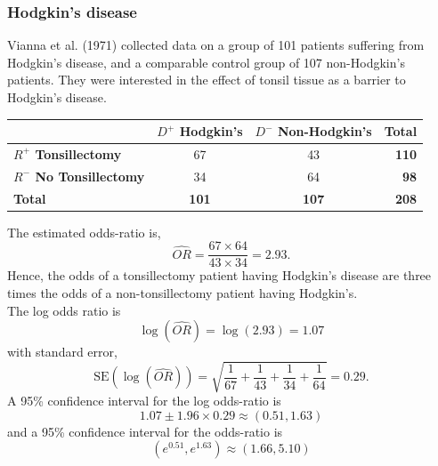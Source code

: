 \documentclass[a4paper]{article}
\begin{document}
\subsubsection{Hodgkin's disease}
Vianna et al. (1971) collected data on a group of 101 patients suffering from Hodgkin's disease, and a comparable control group of 107 non-Hodgkin's patients. They were interested in the effect of tonsil tissue as a barrier to Hodgkin's disease.
\begin{table}[H]
	\centering
	\begin{tabular}{@{}lccr@{}}
	\toprule
				 										   & \textcolor{mygreen}{\textbf{\( D^+ \) Hodgkin's}} & \textcolor{mygreen}{\textbf{\( D^- \) Non-Hodgkin's}} & \textbf{Total}    \\ \midrule
	\textcolor{myred}{\textbf{\( R^+ \) Tonsillectomy}}    & 67    		  									   & 43        		                                       & \textbf{110}  \\
	\textcolor{myred}{\textbf{\( R^- \) No Tonsillectomy}} & 34    		  									   & 64      		                                       & \textbf{98} \\ \midrule
	\textbf{Total} 										   & \textbf{101}				   					   & \textbf{107}                                          & \textbf{208} \\ \bottomrule
	\end{tabular}
\end{table}
The estimated odds-ratio is,
\[
	\widehat{OR} = \frac{67\times 64}{43 \times 34} = 2.93.
\]
Hence, the odds of a tonsillectomy patient having Hodgkin's disease are three times the odds of a non-tonsillectomy patient having Hodgkin's.\\
The log odds ratio is
\[
	\log(\widehat{OR}) = \log(2.93) = 1.07
\]
with standard error,
\[
	\text{SE}(\log(\widehat{OR})) = \textstyle\sqrt{\frac{1}{67} + \frac{1}{43} + \frac{1}{34} + \frac{1}{64}} = 0.29.
\]
A 95\% confidence interval for the log odds-ratio is
\[
	1.07 \pm 1.96 \times 0.29 \approx (0.51,1.63)
\]
and a 95\% confidence interval for the odds-ratio is
\[
	(e^{0.51},e^{1.63}) \approx (1.66,5.10)
\]
\end{document}
